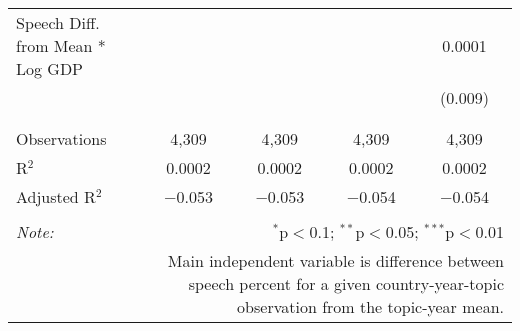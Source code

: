 \begin{table}[!htbp]
\begin{tabular}{@{\extracolsep{5pt}}lcccc}
 Speech Diff. from Mean * Log GDP &  &  &  & 0.0001 \\ 
  &  &  &  & (0.009) \\ 
  & & & & \\ 
\hline \\[-1.8ex] 
Observations & 4,309 & 4,309 & 4,309 & 4,309 \\ 
R$^{2}$ & 0.0002 & 0.0002 & 0.0002 & 0.0002 \\ 
Adjusted R$^{2}$ & $-$0.053 & $-$0.053 & $-$0.054 & $-$0.054 \\ 
\hline 
\hline \\[-1.8ex] 
\textit{Note:}  & \multicolumn{4}{r}{$^{*}$p$<$0.1; $^{**}$p$<$0.05; $^{***}$p$<$0.01} \\ 
 & \multicolumn{4}{r}{Main independent variable is difference between speech percent for a given country-year-topic observation from the topic-year mean.} \\ 
\end{tabular} 
\end{table} 
